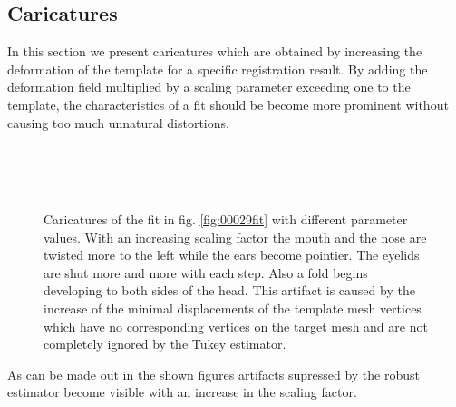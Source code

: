 \subsection{Caricatures}
In this section we present caricatures which are obtained by increasing the deformation of the template for a specific registration result. By adding the deformation field multiplied by a scaling parameter exceeding one to the template, the characteristics of a fit should be become more prominent without causing too much unnatural distortions. 
\begin{figure}[h!]
    \centering
    \\
    \\
    \\
    \caption{Caricatures of the fit in fig. \ref{fig:00029fit} with different parameter values. With an increasing scaling factor the mouth and the nose are twisted more to the left while the ears become pointier. The eyelids are shut more and more with each step. Also a fold begins developing to both sides of the head. This artifact is caused by the increase of the minimal displacements of the template mesh vertices which have no corresponding vertices on the target
mesh and are not completely ignored by the Tukey estimator.}
\label{fig:00029_caricature}
\end{figure}
As can be made out in the shown figures artifacts supressed by the robust estimator become visible with an increase in the scaling factor.

